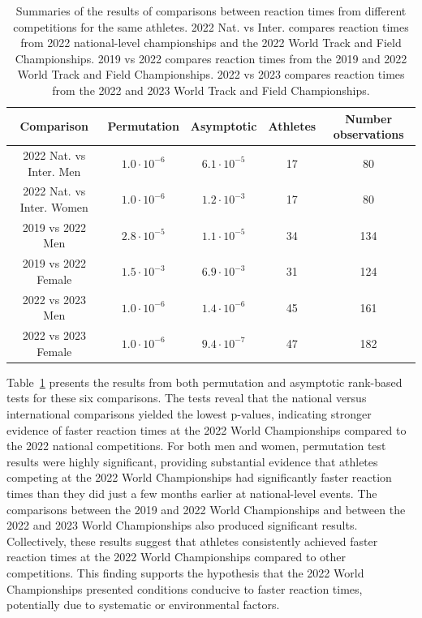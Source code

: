 \documentclass[12pt, letterpaper]{article}
\begin{document}
\begin{table}
  \centering
  \caption{Summaries of the results of comparisons between 
    reaction times from different competitions for the same athletes. 
    2022 Nat. vs Inter. compares reaction times from 2022 national-level 
    championships and the 2022 World Track and Field Championships. 2019 
    vs 2022 compares reaction times from the 2019 and 2022 World Track and 
    Field Championships. 2022 vs 2023 compares reaction times from the 
    2022 and 2023 World Track and Field Championships.}
  \begin{tabular}{c c c c c} 
   \toprule
   Comparison & Permutation & Asymptotic & Athletes & Number observations  \\ 
   \midrule
   2022 Nat. vs Inter. Men & $1.0 \cdot 10^{-6}$ & $ 6.1 \cdot 10^{-5}$ & 17 & 80 \\
   2022 Nat. vs Inter. Women & $1.0 \cdot 10^{-6}$ & $ 1.2 \cdot 10^{-3}$ & 17 & 80 \\[1ex]
   2019 vs 2022 Men & $2.8 \cdot 10^{-5}$ & $1.1 \cdot 10^{-5}$ & 34 & 134 \\
   2019 vs 2022 Female & $ 1.5 \cdot 10^{-3}$ & $6.9 \cdot 10^{-3}$ & 31 & 124 \\[1ex]
   2022 vs 2023 Men & $1.0 \cdot 10^{-6}$ & $1.4 \cdot 10^{-6}$ & 45 & 161 \\
   2022 vs 2023 Female & $1.0 \cdot 10^{-6}$ & $9.4 \cdot 10^{-7}$ & 47 & 182 \\
   \bottomrule
  \end{tabular}
  \label{tab:Clusrankresults}
\end{table}



Table~\ref{tab:Clusrankresults} presents the results from both permutation 
and asymptotic rank-based tests for these six comparisons. The tests reveal 
that the national versus international comparisons yielded the lowest 
p-values, indicating stronger evidence of faster reaction times at the 
2022 World Championships compared to the 2022 national competitions. For 
both men and women, permutation test results were highly significant, 
providing substantial evidence that athletes competing at the 2022 World 
Championships had significantly faster reaction times than they did just 
a few months earlier at national-level events. The comparisons between the 
2019 and 2022 World Championships and between the 2022 and 2023 World 
Championships also produced significant results. Collectively, 
these results suggest that athletes consistently achieved faster reaction 
times at the 2022 World Championships compared to other competitions. This 
finding supports the hypothesis that the 2022 World Championships presented 
conditions conducive to faster reaction times, potentially due to systematic 
or environmental factors.
\end{document}

